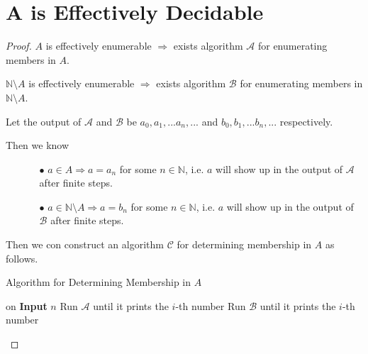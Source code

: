 \documentclass{article}
\begin{document}
\vspace{1em}
\section{$\boldsymbol{A}$ is Effectively Decidable}
\vspace{1em}
\begin{proof}
    $A$ is effectively enumerable $\Longrightarrow$ exists algorithm $\mathcal{A}$ for enumerating members in $A$.

    \hspace{1.3em}
    $\mathbb{N}\setminus A$ is effectively enumerable $\Longrightarrow$ exists algorithm $\mathcal{B}$ for enumerating members in $\mathbb{N}\setminus A$.

    \hspace{1.3em}
    Let the output of $\mathcal{A}$ and $\mathcal{B}$ be $a_0,a_1,...a_n,...$ and $b_0,b_1,...b_n,...$ respectively. 
    
    \hspace{1.3em}
    Then we know

    \vspace{-0.6em}
    \begin{itemize}
        \item[] \begin{itemize}
            \item[$\bullet$] $a\in A\Rightarrow a=a_n$ for some $n\in\mathbb{N}$, i.e. $a$ will show up in the output of $\mathcal{A}$ after finite steps.
            \item[$\bullet$] $a\in \mathbb{N}\setminus A \Rightarrow a=b_n$ for some $n\in\mathbb{N}$, i.e. $a$ will show up in the output of $\mathcal{B}$ after finite steps.
        \end{itemize}
    \end{itemize}

    \vspace{0.5em} \hspace{1.3em}
    Then we con construct an algorithm $\mathcal{C}$ for determining membership in $A$ as follows.

    \vspace{-0.5em}
    \begin{algorithm}
        \caption{Algorithm for Determining Membership in $A$}
        
	    {
        on \textbf{Input} $n$\;
        {
            Run $\mathcal{A}$ until it prints the $i$-th number\;
            Run $\mathcal{B}$ until it prints the $i$-th number\;
        }
        }
    \end{algorithm}


\end{proof}
\end{document}
